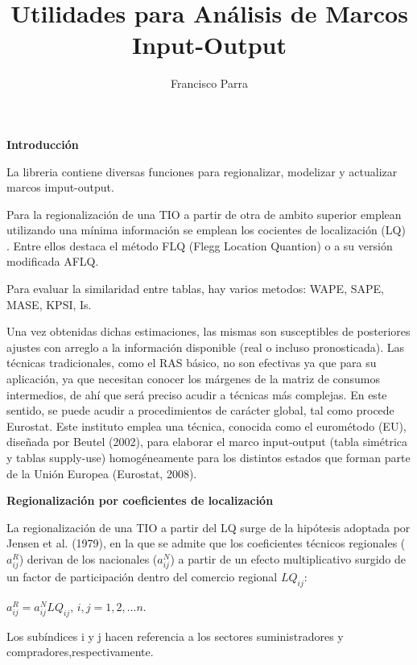 \documentclass{article}
\begin{document}


\title{Utilidades para Análisis de Marcos Input-Output }
\author{Francisco Parra}
\maketitle


\vspace{1.5cm}

{\bf Introducción}

La libreria contiene diversas funciones para regionalizar, modelizar y actualizar marcos imput-output.

Para la regionalización de una TIO a partir de otra de ambito superior emplean utilizando una mínima información se emplean los cocientes de localización (LQ) . Entre ellos destaca el método FLQ (Flegg Location Quantion) o a su versión modificada AFLQ.

Para evaluar la similaridad entre tablas, hay varios metodos: WAPE, SAPE, MASE, KPSI, Is.

Una vez obtenidas dichas estimaciones, las mismas son susceptibles de posteriores ajustes con arreglo a la información disponible (real o incluso pronosticada). Las técnicas tradicionales, como el RAS básico, no son efectivas ya que para su aplicación, ya que necesitan conocer los márgenes de la matriz de consumos intermedios, de ahí que será preciso acudir a técnicas más complejas. En este sentido, se puede acudir a procedimientos de carácter global, tal como procede Eurostat. Este instituto emplea una técnica, conocida como el eurométodo (EU), diseñada por Beutel (2002), para elaborar el marco input-output (tabla simétrica y tablas supply-use) homogéneamente para los distintos estados que forman parte de la Unión Europea (Eurostat, 2008).



{\bf Regionalización por coeficientes de localización}

La regionalización de una TIO a partir del LQ surge  de la hipótesis adoptada por Jensen et al. (1979), en la que se admite que los coeficientes técnicos regionales ($a^R_{ij}$) derivan de los nacionales ($a^N_{ij}$) a partir de un efecto multiplicativo surgido de un factor de participación dentro del comercio regional $LQ_{ij}$:

$a^R_{ij}=a^N_{ij}LQ_{ij}$, $i,j=1,2,...n$.

Los subíndices i y j hacen referencia a los sectores suministradores y compradores,respectivamente.
\end{document}
